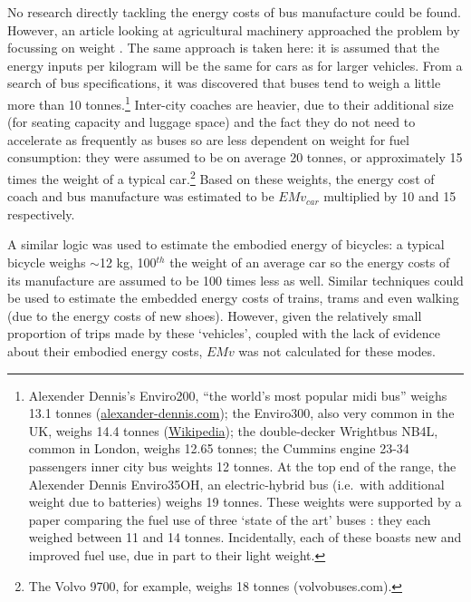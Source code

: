 No research directly tackling the energy costs of bus manufacture could be found.
However, an article looking at agricultural machinery approached the
problem by focussing on weight \citep{Mikkola201023}. The same approach is
taken here: it is assumed that the energy inputs per kilogram will be the same
for cars as for larger vehicles. From a
search of bus specifications, it was discovered that buses tend to weigh
a little more than 10 tonnes.\footnote{Alexender Dennis's
Enviro200, ``the world's \label{fnbuses}
most popular midi bus'' weighs 13.1 tonnes
(\href{http://www.alexander-dennis.com/uploads/files/e200_spec_sheet.pdf}
{alexander-dennis.com}); the Enviro300, also very common
in the UK, weighs 14.4 tonnes
(\href{https://en.wikipedia.org/wiki/Alexander_Dennis_Enviro300}{Wikipedia});
the double-decker Wrightbus NB4L, common in London, weighs 12.65 tonnes; the
Cummins engine 23-34 passengers inner city bus weights 12 tonnes.
At the top end of the range, the Alexender Dennis  Enviro35OH,
an electric-hybrid bus (i.e.~with additional weight due to batteries)
weighs 19 tonnes.
These weights were supported by a paper comparing the fuel use of three
`state of the art' buses \citep{pelkmans2001emissions}:
they each weighed between 11 and 14 tonnes. Incidentally, each of these
boasts new and improved fuel use, due in part to their light weight.
}
Inter-city coaches are heavier, due to their additional size (for seating capacity
and luggage space) and the fact they do not need to accelerate as
frequently as buses so are less dependent on
weight for fuel consumption: they were assumed to be on average 20
tonnes, or approximately 15 times the weight of a typical
car.\footnote{The Volvo 9700, for example, weighs 18 tonnes
(volvobuses.com).}
Based on these weights, the energy cost of coach and bus manufacture was
estimated to be $EMv_{car}$ multiplied by 10 and 15 respectively.

A similar logic was used to estimate the embodied energy of bicycles:
a typical bicycle weighs $\sim$12 kg, 100$^{th}$ the weight of an average
car so the energy costs of its manufacture are assumed to be 100 times less
as well.
Similar techniques could be used to estimate the embedded energy costs of
trains, trams and even walking (due to the energy costs of new shoes).
However, given the relatively small proportion of trips made by these
`vehicles', coupled with the lack of evidence about their embodied energy
costs, $EMv$ was not calculated for these modes.

